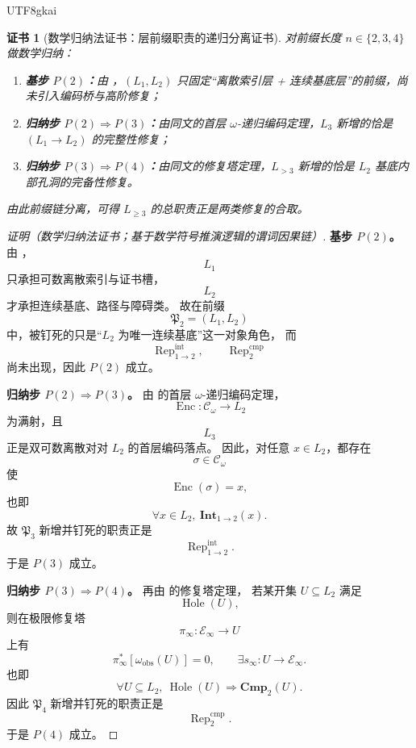 \documentclass[12pt]{article}
\newtheorem{Certificate}{证书}[section]
\newcommand{\Hole}{\operatorname{Hole}}
\begin{document}
\begin{CJK*}{UTF8}{gkai}
\begin{Certificate}[数学归纳法证书：层前缀职责的递归分离证书]
\label{cert:tex1-ch11-axiom-downgraded}
对前缀长度 \(n\in\{2,3,4\}\) 做数学归纳：
\begin{enumerate}
  \item \textbf{基步 \(P(2)\)：}由 \cite{RepoTex41HomotopyRepairBundle}，\((L_1,L_2)\) 只固定“离散索引层 + 连续基底层”的前缀，尚未引入编码桥与高阶修复；
  \item \textbf{归纳步 \(P(2)\Rightarrow P(3)\)：}由同文的首层 \(\omega\)-递归编码定理，\(L_3\) 新增的恰是 \((L_1\to L_2)\) 的完整性修复；
  \item \textbf{归纳步 \(P(3)\Rightarrow P(4)\)：}由同文的修复塔定理，\(L_{>3}\) 新增的恰是 \(L_2\) 基底内部孔洞的完备性修复。
\end{enumerate}
由此前缀链分离，可得 \(L_{\ge3}\) 的总职责正是两类修复的合取。
\end{Certificate}

\begin{proof}[证明（数学归纳法证书；基于数学符号推演逻辑的谓词因果链）]
\textbf{基步 \(P(2)\)。}
由 \cite{RepoTex41HomotopyRepairBundle}，
\[
  L_1
\]
只承担可数离散索引与证书槽，
\[
  L_2
\]
才承担连续基底、路径与障碍类。
故在前缀
\[
  \mathfrak P_2=(L_1,L_2)
\]
中，被钉死的只是“\(L_2\) 为唯一连续基底”这一对象角色，
而
\[
  \operatorname{Rep}^{\mathrm{int}}_{1\to2},
  \qquad
  \operatorname{Rep}^{\mathrm{cmp}}_{2}
\]
尚未出现，因此 \(P(2)\) 成立。

\textbf{归纳步 \(P(2)\Rightarrow P(3)\)。}
由 \cite{RepoTex41HomotopyRepairBundle} 的首层 \(\omega\)-递归编码定理，
\[
  \operatorname{Enc}:\mathcal C_\omega\to L_2
\]
为满射，且
\[
  L_3
\]
正是双可数离散对对 \(L_2\) 的首层编码落点。
因此，对任意 \(x\in L_2\)，都存在
\[
  \sigma\in\mathcal C_\omega
\]
使
\[
  \operatorname{Enc}(\sigma)=x,
\]
也即
\[
  \forall x\in L_2,\ \mathbf{Int}_{1\to2}(x).
\]
故 \(\mathfrak P_3\) 新增并钉死的职责正是
\[
  \operatorname{Rep}^{\mathrm{int}}_{1\to2}.
\]
于是 \(P(3)\) 成立。

\textbf{归纳步 \(P(3)\Rightarrow P(4)\)。}
再由 \cite{RepoTex41HomotopyRepairBundle} 的修复塔定理，
若某开集 \(U\subseteq L_2\) 满足
\[
  \Hole(U),
\]
则在极限修复塔
\[
  \pi_\infty:\mathcal E_\infty\to U
\]
上有
\[
  \pi_\infty^\ast[\omega_{\mathrm{obs}}(U)]=0,
  \qquad
  \exists s_\infty:U\to\mathcal E_\infty.
\]
也即
\[
  \forall U\subseteq L_2,\ \Hole(U)\Rightarrow \mathbf{Cmp}_2(U).
\]
因此 \(\mathfrak P_4\) 新增并钉死的职责正是
\[
  \operatorname{Rep}^{\mathrm{cmp}}_{2}.
\]
于是 \(P(4)\) 成立。


\end{proof}
\end{CJK*}
\end{document}
